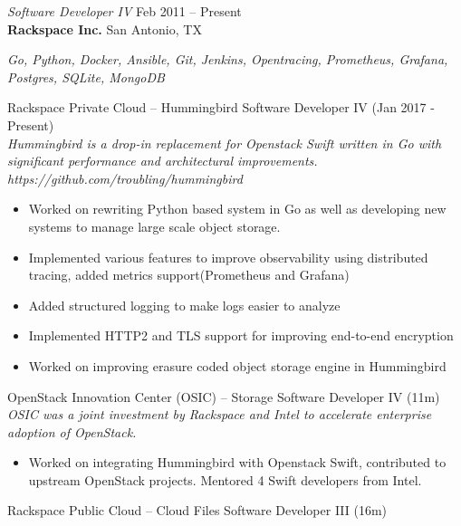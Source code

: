 \documentclass[margin,line]{resume}
\begin{document}
\begin{resume}
{\sl Software Developer IV } \hfill
     Feb 2011 -- Present\\
     \textbf{Rackspace Inc.} \hfill
     San Antonio, TX\\[4pt]
{\small\centering\textit{Go, Python, Docker, Ansible, Git, Jenkins, Opentracing, Prometheus, Grafana, Postgres, SQLite, MongoDB}\par}\vspace*{-\baselineskip}
\vspace{4pt}
{\small Rackspace Private Cloud -- Hummingbird  \hfill  Software Developer IV (Jan 2017 - Present)}\\
{\small\textit{Hummingbird is a drop-in replacement for Openstack
Swift written in Go with significant performance and architectural improvements. https://github.com/troubling/hummingbird}}
\begin{itemize} \itemsep -2pt %
\small\item Worked on rewriting Python based system in Go as well as developing new systems to manage large scale object storage.
\small\item Implemented various features to improve observability using distributed tracing, added metrics support(Prometheus and Grafana)
\small\item Added structured logging to make logs easier to analyze
\small\item Implemented HTTP2 and TLS support for improving end-to-end encryption
\small\item Worked on improving erasure coded object storage engine in Hummingbird
\end{itemize}\vspace*{-\baselineskip} %
\vspace{4pt}
{\small OpenStack Innovation Center (OSIC) -- Storage  \hfill  Software Developer IV (11m)}\\
{\small\textit{OSIC was a joint investment by Rackspace and Intel to accelerate enterprise adoption of OpenStack.}}
\begin{itemize} \itemsep -2pt %
\small\item Worked on integrating Hummingbird with Openstack Swift, contributed to upstream OpenStack projects. Mentored 4 Swift developers from Intel.
\end{itemize}\vspace*{-\baselineskip} %
\vspace{4pt}
{\small Rackspace Public Cloud -- Cloud Files  \hfill  Software Developer III (16m)}\\

\end{resume}
\end{document}
